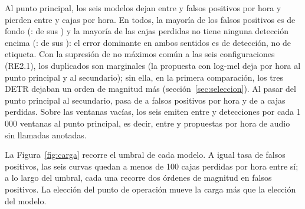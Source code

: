 \documentclass[12pt,a4paper]{article}
\begin{document}
 Al punto principal, los seis modelos dejan entre
\fpPerHourMin{} y \fpPerHourMax{} falsos positivos por hora y pierden entre
\missedPerHourMin{} y \missedPerHourMax{} cajas por hora. En todos, la mayoría de los falsos
positivos es de fondo (\bestModel{}: \bestFpBackgroundShare{} de sus \bestFpPerHour{}) y la
mayoría de las cajas perdidas no tiene ninguna detección encima (\bestModel{}:
\bestMissedBareShare{} de sus \bestMissedPerHour{}): el error dominante en ambos sentidos es
de detección, no de etiqueta. Con la supresión de no máximos común a las seis configuraciones
(RE2.1), los duplicados son marginales (la propuesta con log-mel deja
\logmelDuplicatesMain{} por hora al punto principal y \logmelDuplicatesAlt{} al secundario);
sin ella, en la primera comparación, los tres DETR dejaban un orden de magnitud más
(sección~\ref{sec:seleccion}). Al pasar del
punto principal al secundario, \bestModel{} pasa de \bestFpPerHour{} a \bestFpAltPerHour{}
falsos positivos por hora y de \bestMissedPerHour{} a \bestMissedAltPerHour{} cajas
perdidas. Sobre las ventanas vacías, los seis emiten entre \fpEmptyMin{} y \fpEmptyMax{}
detecciones por cada 1\,000 ventanas al punto principal, es decir, entre \fpEmptyHourMin{} y
\fpEmptyHourMax{} propuestas por hora de audio sin llamadas anotadas. 

 La Figura~\ref{fig:carga} recorre el umbral de cada modelo.
A igual tasa de falsos positivos, las seis curvas quedan a menos de 100 cajas perdidas por
hora entre sí; a lo largo del umbral, cada una recorre dos órdenes de magnitud en falsos
positivos. La elección del punto de operación mueve la carga más que la elección del modelo.
\end{document}
